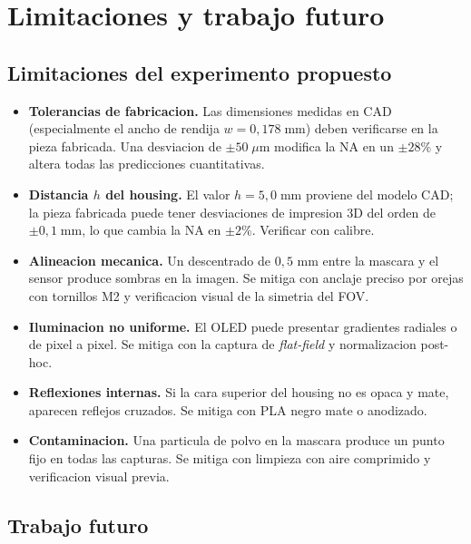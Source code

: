\documentclass[11pt,a4paper,oneside]{report}
\begin{document}
\chapter{Limitaciones y trabajo futuro}

\section{Limitaciones del experimento propuesto}

\begin{limitacion}
\begin{itemize}[leftmargin=1.5em]
  \item \textbf{Tolerancias de fabricacion.} Las dimensiones medidas en CAD
        (especialmente el ancho de rendija $w = 0{,}178\;\mathrm{mm}$) deben
        verificarse en la pieza fabricada. Una desviacion de $\pm 50\;\mu$m
        modifica la NA en un $\pm 28\%$ y altera todas las predicciones
        cuantitativas.
  \item \textbf{Distancia $h$ del housing.} El valor $h = 5{,}0\;\mathrm{mm}$
        proviene del modelo CAD; la pieza fabricada puede tener desviaciones
        de impresion 3D del orden de $\pm 0{,}1\;\mathrm{mm}$, lo que cambia
        la NA en $\pm 2\%$. Verificar con calibre.
  \item \textbf{Alineacion mecanica.} Un descentrado de $0{,}5$ mm entre
        la mascara y el sensor produce sombras en la imagen. Se mitiga con
        anclaje preciso por orejas con tornillos M2 y verificacion visual
        de la simetria del FOV.
  \item \textbf{Iluminacion no uniforme.} El OLED puede presentar gradientes
        radiales o de pixel a pixel. Se mitiga con la captura de
        \emph{flat-field} y normalizacion post-hoc.
  \item \textbf{Reflexiones internas.} Si la cara superior del housing no
        es opaca y mate, aparecen reflejos cruzados. Se mitiga con PLA
        negro mate o anodizado.
  \item \textbf{Contaminacion.} Una particula de polvo en la mascara
        produce un punto fijo en todas las capturas. Se mitiga con
        limpieza con aire comprimido y verificacion visual previa.
\end{itemize}
\end{limitacion}

\section{Trabajo futuro}
\end{document}
